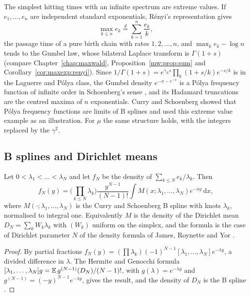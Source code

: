 The simplest hitting times with an infinite spectrum are extreme values. If $e_1,\dots,e_n$ are independent standard exponentials, R\'enyi's representation gives
\[
\max_{k\le n}e_k\overset{d}{=}\sum_{k=1}^n\frac{e_k}k,
\]
the passage time of a pure birth chain with rates $1,2,\dots,n$, and $\max_ke_k-\log n$ tends to the Gumbel law, whose bilateral Laplace transform is $\Gamma(1+s)$ \cite{Renyi53} (compare Chapter~\ref{chap:maxwald}, Proposition~\ref{mw:prop:sum} and Corollary~\ref{cor:maxexp:renyi}). Since $1/\Gamma(1+s)=e^{\gamma_Es}\prod_k(1+s/k)e^{-s/k}$ is in the Laguerre and P\'olya class, the Gumbel density $e^{-x-e^{-x}}$ is a P\'olya frequency function of infinite order in Schoenberg's sense \cite{Schoenberg51}, and its Hadamard truncations are the centred maxima of $n$ exponentials. Curry and Schoenberg \cite{CurrySchoenberg66} showed that P\'olya frequency functions are limits of B splines and used this extreme value example as an illustration.
For $\mu$ the same structure holds, with the integers replaced by the $\gamma^2$.

\subsection{B splines and Dirichlet means}
\begin{proposition}\label{ht:prop:bspline}
Let $0<\lambda_1<\dots<\lambda_N$ and let $f_N$ be the density of $\sum_{k\le N}e_k/\lambda_k$. Then
\[
f_N(y)=\Big(\prod_{k\le N}\lambda_k\Big)\frac{y^{N-1}}{(N-1)!}\int M(x;\lambda_1,\dots,\lambda_N)e^{-xy}\,\mathrm{d}x,
\]
where $M(\cdot;\lambda_1,\dots,\lambda_N)$ is the Curry and Schoenberg B spline with knots $\lambda_k$, normalised to integral one. Equivalently $M$ is the density of the Dirichlet mean $D_N=\sum_kW_k\lambda_k$ with $(W_k)$ uniform on the simplex, and the formula is the case of Dirichlet parameter $N$ of the density formula of James, Roynette and Yor \cite[Theorem 2.1]{JRY}.
\end{proposition}

\begin{proof}
By partial fractions $f_N(y)=(\prod\lambda_k)(-1)^{N-1}[\lambda_1,\dots,\lambda_N]e^{-\lambda y}$, a divided difference in $\lambda$. The Hermite and Genocchi formula $[\lambda_1,\dots,\lambda_N]g=\mathbb{E}\,g^{(N-1)}(D_N)/(N-1)!$, with $g(\lambda)=e^{-\lambda y}$ and $g^{(N-1)}=(-y)^{N-1}e^{-\lambda y}$, gives the result, and the density of $D_N$ is the B spline \cite{CurrySchoenberg66}.
\end{proof}

